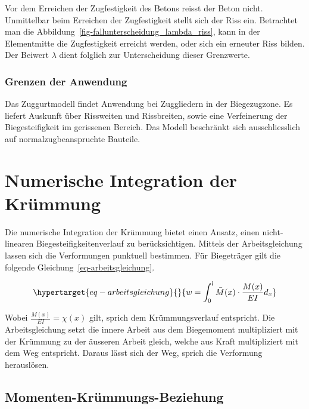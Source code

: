 \documentclass[
  12pt,
  letterpaper,
  egregdoesnotlikesansseriftitles]{scrreprt}
\begin{document}
Vor dem Erreichen der Zugfestigkeit des Betons reisst der Beton nicht.
Unmittelbar beim Erreichen der Zugfestigkeit stellt sich der Riss ein.
Betrachtet man die Abbildung~\ref{fig-fallunterscheidung_lambda_riss},
kann in der Elementmitte die Zugfestigkeit erreicht werden, oder sich
ein erneuter Riss bilden. Der Beiwert \(\lambda\) dient folglich zur
Unterscheidung dieser Grenzwerte.

\hypertarget{grenzen-der-anwendung-1}{%
\subsubsection{Grenzen der Anwendung}\label{grenzen-der-anwendung-1}}

Das Zuggurtmodell findet Anwendung bei Zuggliedern in der Biegezugzone.
Es liefert Auskunft über Rissweiten und Rissbreiten, sowie eine
Verfeinerung der Biegesteifigkeit im gerissenen Bereich. Das Modell
beschränkt sich ausschliesslich auf normalzugbeanspruchte Bauteile.

\hypertarget{sec-numint}{%
\section{Numerische Integration der Krümmung}\label{sec-numint}}

Die numerische Integration der Krümmung bietet einen Ansatz, einen
nicht-linearen Biegesteifigkeitenverlauf zu berücksichtigen. Mittels der
Arbeitsgleichung lassen sich die Verformungen punktuell bestimmen. Für
Biegeträger gilt die folgende Gleichung~\ref{eq-arbeitsgleichung}.

\begin{equation}\protect\hypertarget{eq-arbeitsgleichung}{}{
w = \int_0^l \bar{M}(x) \cdot \frac{M(x)}{EI} d_x
}\label{eq-arbeitsgleichung}\end{equation}

Wobei \(\frac{M(x)}{EI} = \chi(x)\) gilt, sprich dem Krümmungsverlauf
entspricht. Die Arbeitsgleichung setzt die innere Arbeit aus dem
Biegemoment multipliziert mit der Krümmung zu der äusseren Arbeit
gleich, welche aus Kraft multipliziert mit dem Weg entspricht. Daraus
lässt sich der Weg, sprich die Verformung herauslösen.

\hypertarget{momenten-kruxfcmmungs-beziehung}{%
\subsection{Momenten-Krümmungs-Beziehung}\label{momenten-kruxfcmmungs-beziehung}}
\end{document}
